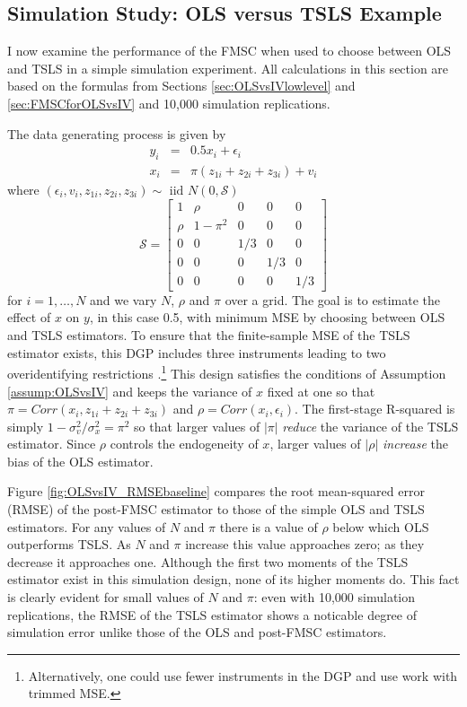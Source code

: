 \subsection{Simulation Study: OLS versus TSLS Example}
\label{sec:OLSvsIVsim}
I now examine the performance of the FMSC when used to choose between OLS and TSLS in a simple simulation experiment. 
All calculations in this section are based on the formulas from Sections \ref{sec:OLSvsIVlowlevel} and \ref{sec:FMSCforOLSvsIV} and 10,000 simulation replications. 

The data generating process is given by 
\begin{eqnarray}
	y_i &=& 0.5 x_i + \epsilon_i\\
	\label{eq:OLSvsIVDGP1}
	x_i &=& \pi(z_{1i} + z_{2i} + z_{3i}) + v_i
	\label{eq:OLSvsIVDGP2}
\end{eqnarray}
where $(\epsilon_i, v_i, z_{1i}, z_{2i}, z_{3i}) \sim \mbox{ iid } N(0, \mathcal{S})$
\begin{equation}
	\mathcal{S} = \left[ \begin{array}
		{ccccc} 
		1 & \rho & 0 & 0 & 0\\
		\rho & 1 - \pi^2 & 0 & 0 & 0\\
		0 & 0 & 1/3 & 0 & 0\\
		0 & 0 & 0 & 1/3 & 0 \\
		0 & 0 & 0 & 0 & 1/3
	\end{array}\right]
	\label{eq:OLSvsIVDGP3}
\end{equation}
for $i= 1, \hdots, N$ and we vary $N$, $\rho$ and $\pi$ over a grid.
The goal is to estimate the effect of $x$ on $y$, in this case 0.5, with minimum MSE by choosing between OLS and TSLS estimators.
To ensure that the finite-sample MSE of the TSLS estimator exists, this DGP includes three instruments leading to two overidentifying restrictions \citep{Phillips1980}.\footnote{Alternatively, one could use fewer instruments in the DGP and use work with trimmed MSE.}
This design satisfies the conditions of Assumption \ref{assump:OLSvsIV} and keeps the variance of $x$ fixed at one so that $\pi = Corr(x_i, z_{1i} + z_{2i} + z_{3i})$ and $\rho = Corr(x_i,\epsilon_i)$.
The first-stage R-squared is simply $1 - \sigma_v^2/\sigma_x^2 = \pi^2$ so that larger values of $|\pi|$ \emph{reduce} the variance of the TSLS estimator.
Since $\rho$ controls the endogeneity of $x$, larger values of $|\rho|$ \emph{increase} the bias of the OLS estimator.

Figure \ref{fig:OLSvsIV_RMSEbaseline} compares the root mean-squared error (RMSE) of the post-FMSC estimator to those of the simple OLS and TSLS estimators.
For any values of $N$ and $\pi$ there is a value of $\rho$ below which OLS outperforms TSLS. 
As $N$ and $\pi$ increase this value approaches zero; as they decrease it approaches one.
Although the first two moments of the TSLS estimator exist in this simulation design, none of its higher moments do. 
This fact is clearly evident for small values of $N$ and $\pi$: even with 10,000 simulation replications, the RMSE of the TSLS estimator shows a noticable degree of simulation error unlike those of the OLS and post-FMSC estimators.

